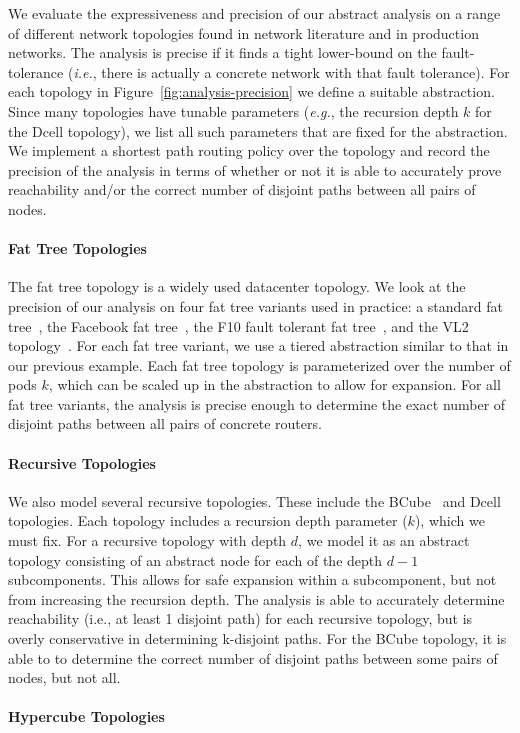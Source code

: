 \documentclass[numbers, 10pt, preprint]{sigplanconf}
\newcommand{\EG}{\emph{e.g.}}
\newcommand{\IE}{\emph{i.e.}}
\newcommand{\para}[1]{\paragraph*{\textbf{#1}}}
\begin{document}
We evaluate the expressiveness and precision of our abstract analysis on a range of different network topologies found in network literature and in production networks. The analysis is precise if it finds a tight lower-bound on the fault-tolerance (\IE, there is actually a concrete network with that fault tolerance).
For each topology in Figure~\ref{fig:analysis-precision} we define a suitable abstraction. Since many topologies have tunable parameters (\EG, the recursion depth $k$ for the Dcell topology), we list all such parameters that are fixed for the abstraction. We implement a shortest path routing policy over the topology and record the precision of the analysis in terms of whether or not it is able to accurately prove reachability and/or the correct number of disjoint paths between all pairs of nodes.

\para{Fat Tree Topologies}

The fat tree topology is a widely used datacenter topology. We look at the precision of our analysis on four fat tree variants used in practice: a standard fat tree~\cite{fattree}, the Facebook fat tree~\cite{facebook-fattree}, the F10 fault tolerant fat tree~\cite{f10-fattree}, and the VL2 topology~\cite{vl2-fattree}. For each fat tree variant, we use a tiered abstraction similar to that in our previous example. Each fat tree topology is parameterized over the number of pods $k$, which can be scaled up in the abstraction to allow for expansion. For all fat tree variants, the analysis is precise enough to determine the exact number of disjoint paths between all pairs of concrete routers.

\para{Recursive Topologies}

We also model several recursive topologies. These include the BCube~\cite{bcube} and Dcell~\cite{dcell} topologies. Each topology includes a recursion depth parameter ($k$), which we must fix. For a recursive topology with depth $d$, we model it as an abstract topology consisting of an abstract node for each of the depth $d-1$ subcomponents. This allows for safe expansion within a subcomponent, but not from increasing the recursion depth. The analysis is able to accurately determine reachability (i.e., at least 1 disjoint path) for each recursive topology, but is overly conservative in determining k-disjoint paths. For the BCube topology, it is able to to determine the correct number of disjoint paths between some pairs of nodes, but not all.

\para{Hypercube Topologies}
\end{document}
